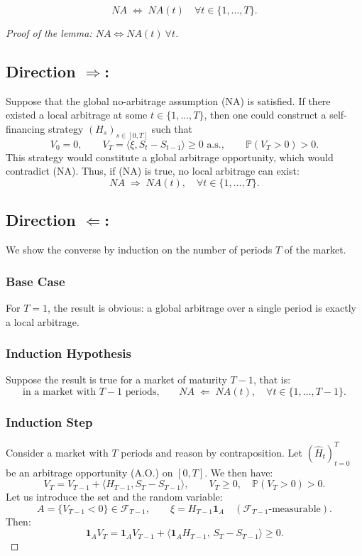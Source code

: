 \begin{lemma}
\[
NA \;\Longleftrightarrow\; NA(t) \quad \forall t \in \{1, \dots, T\}.
\]
\end{lemma}

\begin{proof}[Proof of the lemma: $NA \Longleftrightarrow NA(t)\ \forall t$]
\subsection*{Direction $\Rightarrow$:}
Suppose that the global no-arbitrage assumption (NA) is satisfied.  
If there existed a local arbitrage at some $t \in \{1,\ldots,T\}$, then one could construct a self-financing strategy $(H_s)_{s\in[0,T]}$ such that
\[
V_0 = 0, \qquad 
V_T = \langle \xi, S_t - S_{t-1} \rangle \ge 0 \text{ a.s.}, \qquad 
\mathbb{P}(V_T > 0) > 0.
\]
This strategy would constitute a global arbitrage opportunity, which would contradict (NA).  
Thus, if (NA) is true, no local arbitrage can exist:
\[
NA \;\Rightarrow\; NA(t), \quad \forall t\in\{1,\ldots,T\}.
\]

\subsection*{Direction $\Leftarrow$:}
We show the converse by induction on the number of periods $T$ of the market.

\subsubsection*{Base Case}
For $T=1$, the result is obvious: a global arbitrage over a single period is exactly a local arbitrage.

\subsubsection*{Induction Hypothesis}
Suppose the result is true for a market of maturity $T-1$, that is:
\[
\text{in a market with $T-1$ periods,} \qquad
NA \;\Leftarrow\; NA(t), \quad \forall t \in \{1,\ldots,T-1\}.
\]

\subsubsection*{Induction Step}
Consider a market with $T$ periods and reason by contraposition.  
Let $(\hat H_t)_{t=0}^T$ be an arbitrage opportunity (A.O.) on $[0,T]$.  
We then have:
\[
V_T = V_{T-1} + \langle H_{T-1}, S_T - S_{T-1} \rangle, 
\qquad V_T \ge 0,\quad \mathbb{P}(V_T > 0) > 0.
\]
Let us introduce the set and the random variable:
\[
A = \{ V_{T-1} < 0 \} \in \mathcal{F}_{T-1},
\qquad
\xi = H_{T-1}\mathbf{1}_A \quad (\mathcal{F}_{T-1}\text{-measurable}).
\]
Then:
\[
\mathbf{1}_A V_T
= \mathbf{1}_A V_{T-1}
+ \big\langle \mathbf{1}_A H_{T-1},\, S_T - S_{T-1} \big\rangle
\ge 0.
\]


\end{proof}
